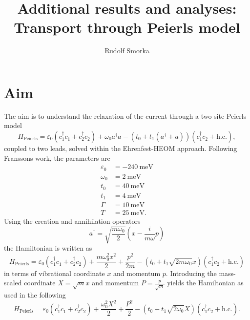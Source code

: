 \documentclass{article}
\newcommand{\pdagger}{{\phantom{\dagger}}}
\begin{document}
\title{Additional results and analyses: Transport through Peierls model}
\author{Rudolf Smorka}
\maketitle
\section{Aim}\label{sec:Aim}
The aim is to understand the relaxation of the current through a two-site Peierls model 
\begin{equation}
	H_\mathrm{Peierls} = \varepsilon_0 (c_1^\dagger c_1^\pdagger + c_2^\dagger c_2^\pdagger)+ \omega_0 a^\dagger a -(t_0 + t_1(a^\dagger + a))(c_1^\dagger c_2^\pdagger + \mathrm{h.c.}),
\end{equation}
coupled to two leads, solved within the Ehrenfest-HEOM approach. Following Franssons work, the parameters are
\begin{align*}
	\varepsilon_0 &= -\SI{240}{\milli\electronvolt}\\
	\omega_0 &= \SI{2}{\milli\electronvolt}\\
	t_0 &= \SI{40}{\milli\electronvolt}\\
	t_1 &= \SI{4}{\milli\electronvolt}\\
	\Gamma &= \SI{10}{\milli\electronvolt}\\
	T &= \SI{25}{\milli\electronvolt}.
\end{align*}
Using the creation and annihilation operators
\begin{equation}
	a^\dagger = \sqrt{\frac{m\omega_0}{2}} \left(x - \frac{i}{m\omega}p\right)
\end{equation}
the Hamiltonian is written as 
\begin{equation}
	H_\mathrm{Peierls} = \varepsilon_0 (c_1^\dagger c_1^\pdagger + c_2^\dagger c_2^\pdagger)+ \frac{m\omega_0^2 x^2}{2} + \frac{p^2}{2 m} -\left(t_0 + t_1\sqrt{2m\omega_0}x\right)(c_1^\dagger c_2^\pdagger + \mathrm{h.c.})
\end{equation}
in terms of vibrational coordinate $x$ and momentum $p$. Introducing the mass-scaled coordinate $X = \sqrt{m}x$ and momentum $P = \frac{p}{\sqrt{m}}$ yields the Hamiltonian as used in the following
\begin{equation}
	H_\mathrm{Peierls} = \varepsilon_0 (c_1^\dagger c_1^\pdagger + c_2^\dagger c_2^\pdagger)+ \frac{\omega_0^2 X^2}{2} + \frac{P^2}{2} -\left(t_0 + t_1\sqrt{2\omega_0}X\right)(c_1^\dagger c_2^\pdagger + \mathrm{h.c.}).
\end{equation}
\end{document}
